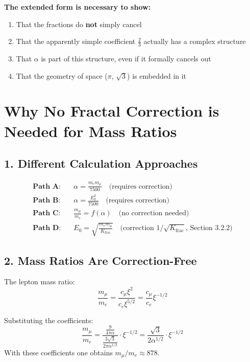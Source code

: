 \begin{tcolorbox}[colback=green!5!white,colframe=green!75!black]
	\textbf{The extended form is necessary to show:}
	\begin{enumerate}
		\item That the fractions do \textbf{not} simply cancel
		\item That the apparently simple coefficient $\frac{2}{3}$ actually has a complex structure
		\item That $\alpha$ is part of this structure, even if it formally cancels out
		\item That the geometry of space ($\pi$, $\sqrt{3}$) is embedded in it
	\end{enumerate}
\end{tcolorbox}

	\section*{Why No Fractal Correction is Needed for Mass Ratios}
	
	\subsection*{1. Different Calculation Approaches}
	
	\begin{align*}
		\textbf{Path A:} &\quad \alpha = \frac{m_e m_\mu}{7500} \quad \text{(requires correction)} \\
		\textbf{Path B:} &\quad \alpha = \frac{E_0^2}{7500} \quad \text{(requires correction)} \\
		\textbf{Path C:} &\quad \frac{m_\mu}{m_e} = f(\alpha) \quad \text{(no correction needed)} \\
		\textbf{Path D:} &\quad E_0 = \sqrt{\frac{m_e m_\mu}{K_{\text{frac}}}} \quad \text{(correction $1/\sqrt{K_{\text{frac}}}$, Section~3.2.2)}
	\end{align*}
	
	\subsection*{2. Mass Ratios Are Correction-Free}
	
	The lepton mass ratio:
	\[
	\frac{m_\mu}{m_e} = \frac{c_\mu \xi^2}{c_e \xi^{5/2}} = \frac{c_\mu}{c_e} \xi^{-1/2}
	\]
	
	Substituting the coefficients:
	\[
	\frac{m_\mu}{m_e} = \frac{\frac{9}{4\pi\alpha}}{\frac{3\sqrt{3}}{2\pi\alpha^{1/2}}} \cdot \xi^{-1/2} = \frac{\sqrt{3}}{2\alpha^{1/2}} \cdot \xi^{-1/2}
	\]
	With these coefficients one obtains $m_\mu/m_e \approx 878$.

